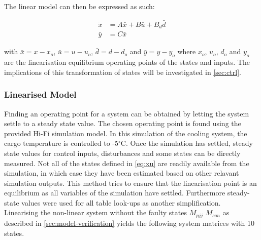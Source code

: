 The linear model can then be expressed as such:

\begin{equation} \label{eq:state_space_linear}
	\begin{split}
		\dot{x} & = A\bar{x} + B\bar{u} + B_d\bar{d} \\
		\bar{y} & = C\bar{x}
	\end{split}
\end{equation}

with $\bar{x} = x-x_o$, $\bar{u} = u-u_o$, $\bar{d} = d-d_o$ and $\bar{y} = y-y_o$ where $x_o$, $u_o$, $d_o$ and $y_o$ are the linearisation equilibrium operating points of the states and inputs. The implications of this transformation of states will be investigated in \cref{sec:ctrl}.

\subsubsection{Linearised Model}\label{sec:linearised-model}
Finding an operating point for a system can be obtained by letting the system settle to a steady state value. The chosen operating point is found using the provided Hi-Fi simulation model. In this simulation of the cooling system, the cargo temperature is controlled to -5$^{\circ}$C. Once the simulation has settled, steady state values for control inputs, disturbances and some states can be directly measured. Not all of the states defined in \cref{eq:xu} are readily available from the simulation, in which case they have been estimated based on other relavant simulation outputs. This method tries to ensure that the linearisation point is an equilibrium as all variables of the simulation have settled. Furthermore steady-state values were used for all table look-ups as another simplification.\\

Linearising the non-linear system without the faulty states $ M_{pjj} $ $ M_{con} $ as described in \cref{sec:model-verification} yields the following system matrices with 10 states.


